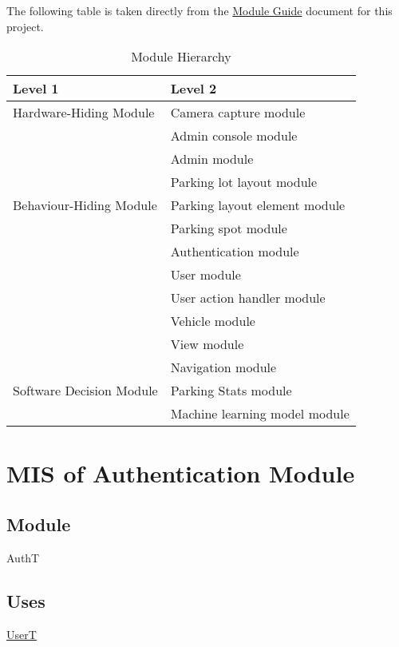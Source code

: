 \documentclass[12pt, titlepage]{article}
\begin{document}
The following table is taken directly from the
\href{https://github.com/parkd-app/park-d/blob/main/docs/Design/SoftArchitecture/MG.pdf}{Module
Guide} document for this project.

\begin{table}[h!]
\centering
\begin{tabular}{p{} p{}}
\toprule
\textbf{Level 1} & \textbf{Level 2}\\
\midrule

{Hardware-Hiding Module} & Camera capture module \\
\midrule

\multirow{7}{0.3\textwidth}{Behaviour-Hiding Module} & Admin console module\\
& Admin module\\
& Parking lot layout module\\
& Parking layout element module\\
& Parking spot module\\
& Authentication module\\
& User module\\
& User action handler module\\
& Vehicle module\\
& View module\\
\midrule

\multirow{3}{0.3\textwidth}{Software Decision Module} & Navigation module\\
& Parking Stats module\\
& Machine learning model module\\
\bottomrule

\end{tabular}
\caption{Module Hierarchy}
\label{TblMH}
\end{table}

\newpage

\section{MIS of Authentication Module} 
\label{auth:Module}

\subsection{Module}
AuthT

\subsection{Uses}
\hyperref[user:Module]{UserT}
\end{document}
